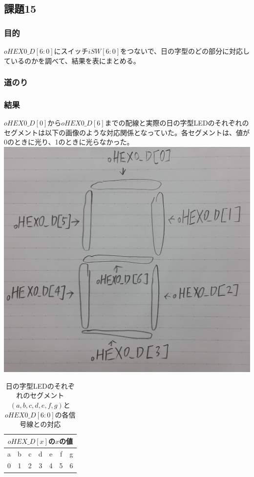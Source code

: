 \documentclass[a4paper]{jarticle}
\begin{document}
\subsection{課題15}
\subsubsection{目的}
$oHEX0\_D[6:0]$にスイッチ$iSW[6:0]$をつないで、日の字型のどの部分に対応しているのかを調べて、結果を表にまとめる。
\subsubsection{道のり}
\subsubsection{結果}
$oHEX0\_D[0]$から$oHEX0\_D[6]$までの配線と実際の日の字型LEDのそれぞれのセグメントは以下の画像のような対応関係となっていた。各セグメントは、値が0のときに光り、1のときに光らなかった。\\
\includegraphics[width=15cm]{work15/SevenSegmentDisplay.jpg}
\begin{table}[!h]
	\begin{center}
		\caption{日の字型LEDのそれぞれのセグメント$ \left( a,b,c,d,e,f,g \right) $と$oHEX0\_D[6:0]$の各信号線との対応}
		\label{Work15Table}
		\begin{tabular}{|c|c|c|c|c|c|c|}
			\hline
			\multicolumn{7}{|c|}{$oHEX\_D[x]$の$x$の値}\\		\hline
			a	&b	&c	&d	&e	&f	&g\\	\hline
			0	&1	&2	&3	&4	&5	&6\\	\hline
		\end{tabular}
	\end{center}
\end{table}
\end{document}
